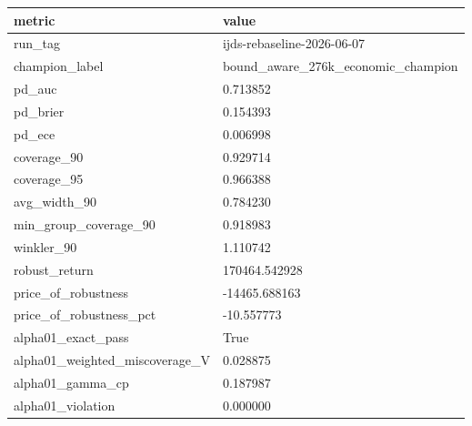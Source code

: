 \begin{tabular}{ll}
\toprule
metric & value \\
\midrule
run\_tag & ijds-rebaseline-2026-06-07 \\
champion\_label & bound\_aware\_276k\_economic\_champion \\
pd\_auc & 0.713852 \\
pd\_brier & 0.154393 \\
pd\_ece & 0.006998 \\
coverage\_90 & 0.929714 \\
coverage\_95 & 0.966388 \\
avg\_width\_90 & 0.784230 \\
min\_group\_coverage\_90 & 0.918983 \\
winkler\_90 & 1.110742 \\
robust\_return & 170464.542928 \\
price\_of\_robustness & -14465.688163 \\
price\_of\_robustness\_pct & -10.557773 \\
alpha01\_exact\_pass & True \\
alpha01\_weighted\_miscoverage\_V & 0.028875 \\
alpha01\_gamma\_cp & 0.187987 \\
alpha01\_violation & 0.000000 \\
\bottomrule
\end{tabular}
